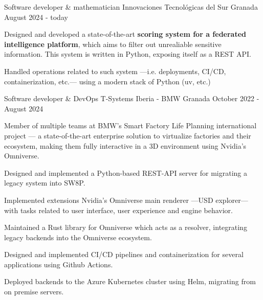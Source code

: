 
\begin{cventries}
	\cventry
		{Software developer \& mathematician}
		{Innovaciones Tecnológicas del Sur}
		{Granada}
		{August 2024 - today}
		{
			\begin{cvitems}
    		\item {Designed and developed a state-of-the-art \textbf{scoring system for a federated intelligence platform}, which aims to filter out unrealiable sensitive information. This system is written in Python, exposing itself as a REST API.}
    		\item {Handled operations related to such system —i.e. deployments, CI/CD, containerization, etc.— using a modern stack of Python (uv, etc.) }
			\end{cvitems}
		}
	\cventry
		{Software developer \& DevOps} %
		{T-Systems Iberia - BMW} %
		{Granada} %
		{October 2022 - August 2024} %
		{
				\begin{cvitems} %
						\item {Member of multiple teams at BMW's Smart Factory Life Planning international project — a state-of-the-art enterprise solution to virtualize factories and their ecosystem, making them fully interactive in a 3D environment using Nvidia's Omniverse.}
						\item {Designed and implemented a Python-based REST-API server for migrating a legacy system into SW8P.}
						\item {Implemented extensions Nvidia's Omniverse main renderer —USD explorer— with tasks related to user interface, user experience and engine behavior.}
						\item {Maintained a Rust library for Omniverse which acts as a resolver, integrating legacy backends into the Omniverse ecosystem.}
						\item {Designed and implemented CI/CD pipelines and containerization for several applications using Github Actions.}
						\item {Deployed backends to the Azure Kubernetes cluster using Helm, migrating from on premise servers.}
				\end{cvitems}
		}
\end{cventries}
